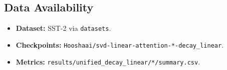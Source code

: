 \subsection{Data Availability}

\begin{itemize}
\item \textbf{Dataset:} SST-2 via \texttt{datasets}.
\item \textbf{Checkpoints:} \texttt{Hooshaai/svd-linear-attention-*-decay\_linear}.
\item \textbf{Metrics:} \texttt{results/unified\_decay\_linear/*/summary.csv}.

\end{itemize}

